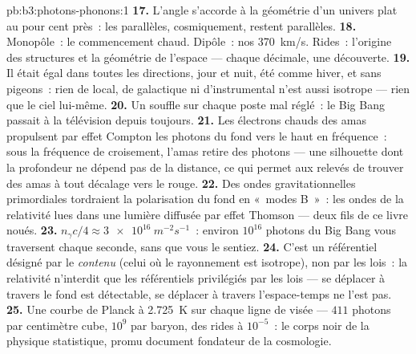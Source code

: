 \begin{solution}{pb:b3:photons-phonons:1}
\textbf{17.} L'angle s'accorde à la géométrie d'un univers plat
au pour cent près~: les parallèles, cosmiquement, restent
parallèles.
\textbf{18.} Monopôle~: le commencement chaud. Dipôle~: nos
\qty{370}{km/s}. Rides~: l'origine des structures et la géométrie
de l'espace --- chaque décimale, une découverte.
\textbf{19.} Il était égal dans toutes les directions, jour et
nuit, été comme hiver, et sans pigeons~: rien de local, de
galactique ni d'instrumental n'est aussi isotrope --- rien que le
ciel lui-même.
\textbf{20.} Un souffle sur chaque poste mal réglé~: le Big Bang
passait à la télévision depuis toujours.
\textbf{21.} Les électrons chauds des amas propulsent par effet
Compton les photons du fond vers le haut en fréquence~: sous la
fréquence de croisement, l'amas retire des photons --- une
silhouette dont la profondeur ne dépend pas de la distance, ce qui
permet aux relevés de trouver des amas à tout décalage vers le
rouge.
\textbf{22.} Des ondes gravitationnelles primordiales tordraient
la polarisation du fond en «~modes B~»~: les ondes de la
relativité lues dans une lumière diffusée par effet Thomson ---
deux fils de ce livre noués.
\textbf{23.} $n_\gamma c/4 \approx \qty{3e16}{m^{-2}s^{-1}}$~:
environ $10^{16}$ photons du Big Bang vous traversent chaque
seconde, sans que vous le sentiez.
\textbf{24.} C'est un référentiel désigné par le \emph{contenu}
(celui où le rayonnement est isotrope), non par les lois~: la
relativité n'interdit que les référentiels privilégiés par les
lois --- se déplacer à travers le fond est détectable, se déplacer
à travers l'espace-temps ne l'est pas.
\textbf{25.} Une courbe de Planck à \qty{2.725}{K} sur chaque
ligne de visée --- $411$ photons par centimètre cube, $10^9$ par
baryon, des rides à $10^{-5}$~: le corps noir de la physique
statistique, promu document fondateur de la cosmologie.
\end{solution}
